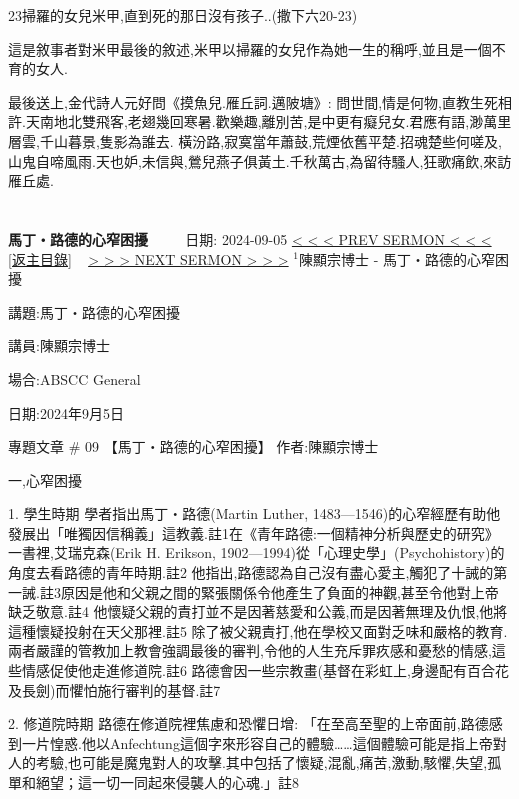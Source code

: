 \documentclass{book}
\begin{document}
23掃羅的女兒米甲,直到死的那日沒有孩子..(撒下六20-23)

這是敘事者對米甲最後的敘述,米甲以掃羅的女兒作為她一生的稱呼,並且是一個不育的女人.

最後送上,金代詩人元好問《摸魚兒.雁丘詞.邁陂塘》:
問世間,情是何物,直教生死相許.天南地北雙飛客,老翅幾回寒暑.歡樂趣,離別苦,是中更有癡兒女.君應有語,渺萬里層雲,千山暮景,隻影為誰去. 橫汾路,寂寞當年蕭鼓,荒煙依舊平楚.招魂楚些何嗟及,山鬼自啼風雨.天也妒,未信與,鶯兒燕子俱黃土.千秋萬古,為留待騷人,狂歌痛飲,來訪雁丘處.
\newpage



\section{}
\label{sec:15}
\textbf{馬丁‧路德的心窄困擾}
\newline
\newline
~~~~ 日期: 2024-09-05
\newline
\newline
\hyperref[sec:14]{\small{< < < PREV SERMON < < <}}
~
\hyperref[sec:index]{\small{[返主目錄]}}
~
\hyperref[sec:16]{\small{> > > NEXT SERMON > > >}}
\newline
\newline
$^{1}$陳顯宗博士 - 馬丁‧路德的心窄困擾

講題:馬丁‧路德的心窄困擾

講員:陳顯宗博士

場合:ABSCC General

日期:2024年9月5日

專題文章 \# 09
【馬丁‧路德的心窄困擾】
作者:陳顯宗博士

一,心窄困擾

1. 學生時期
學者指出馬丁‧路德(Martin Luther, 1483—1546)的心窄經歷有助他發展出「唯獨因信稱義」這教義.註1在《青年路德:一個精神分析與歷史的研究》一書裡,艾瑞克森(Erik H. Erikson, 1902—1994)從「心理史學」(Psychohistory)的角度去看路德的青年時期.註2 他指出,路德認為自己沒有盡心愛主,觸犯了十誡的第一誡.註3原因是他和父親之間的緊張關係令他產生了負面的神觀,甚至令他對上帝缺乏敬意.註4 他懷疑父親的責打並不是因著慈愛和公義,而是因著無理及仇恨,他將這種懷疑投射在天父那裡.註5 除了被父親責打,他在學校又面對乏味和嚴格的教育.兩者嚴謹的管教加上教會強調最後的審判,令他的人生充斥罪疚感和憂愁的情感,這些情感促使他走進修道院.註6 路德會因一些宗教畫(基督在彩虹上,身邊配有百合花及長劍)而懼怕施行審判的基督.註7

2. 修道院時期
路德在修道院裡焦慮和恐懼日增:
「在至高至聖的上帝面前,路德感到一片惶惑.他以Anfechtung這個字來形容自己的體驗……這個體驗可能是指上帝對人的考驗,也可能是魔鬼對人的攻擊.其中包括了懷疑,混亂,痛苦,激動,駭懼,失望,孤單和絕望；這一切一同起來侵襲人的心魂.」註8
\end{document}

